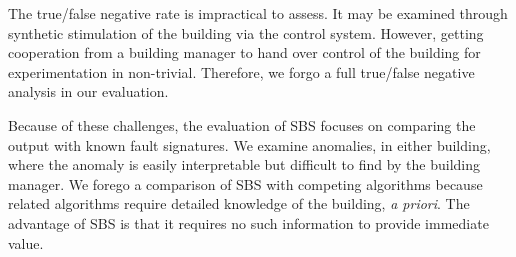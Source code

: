 The true/false negative rate is impractical to assess.  It may be examined through synthetic stimulation of
the building via the control system.  However, getting cooperation from a building manager to hand over control of the building
for experimentation in non-trivial.  Therefore, we forgo a full true/false negative analysis in our evaluation.

Because of these challenges, the evaluation of SBS focuses on comparing the output with known fault
signatures.  We examine anomalies, in either building, where the anomaly is easily interpretable but
difficult to find by the building manager.  We forego a comparison of SBS with competing algorithms because
 related algorithms require detailed knowledge of the building, \emph{a priori}.  The advantage of SBS is that it 
requires no such information to provide immediate value.